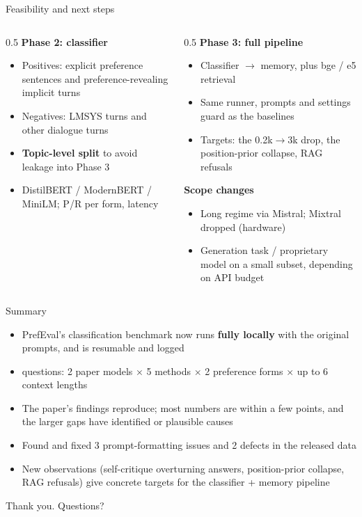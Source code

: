 \documentclass[aspectratio=169,11pt]{beamer}
\begin{document}
\begin{frame}{Feasibility and next steps}
\begin{columns}[T]
\begin{column}{0.5\textwidth}
\textbf{Phase 2: classifier}
\begin{itemize}
  \item Positives: explicit preference sentences and preference-revealing implicit turns
  \item Negatives: LMSYS turns and other dialogue turns
  \item \textbf{Topic-level split} to avoid leakage into Phase 3
  \item DistilBERT / ModernBERT / MiniLM; P/R per form, latency
\end{itemize}
\end{column}
\begin{column}{0.5\textwidth}
\textbf{Phase 3: full pipeline}
\begin{itemize}
  \item Classifier $\rightarrow$ memory, plus bge / e5 retrieval
  \item Same runner, prompts and settings guard as the baselines
  \item Targets: the 0.2k$\rightarrow$3k drop, the position-prior collapse, RAG refusals
\end{itemize}
\textbf{Scope changes}
\begin{itemize}
  \item Long regime via Mistral; Mixtral dropped (hardware)
  \item Generation task / proprietary model on a small subset, depending on API budget
\end{itemize}
\end{column}
\end{columns}
\end{frame}

\begin{frame}{Summary}
\begin{itemize}
  \item PrefEval's classification benchmark now runs \textbf{fully locally} with the original prompts, and is resumable and logged
  \item \nQuestions{} questions: 2 paper models $\times$ 5 methods $\times$ 2 preference forms $\times$ up to 6 context lengths
  \item The paper's findings reproduce; most numbers are within a few points, and the larger gaps have identified or plausible causes
  \item Found and fixed 3 prompt-formatting issues and 2 defects in the released data
  \item New observations (self-critique overturning answers, position-prior collapse, RAG refusals) give concrete targets for the classifier + memory pipeline
\end{itemize}
\vspace{10pt}
\centering\Large\textcolor{accent}{Thank you. Questions?}
\end{frame}
\end{document}
